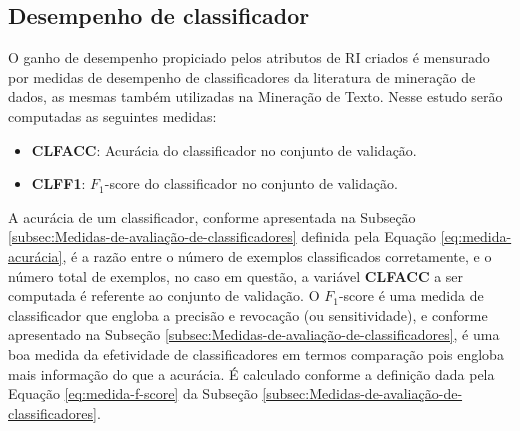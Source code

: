     \subsection{Desempenho de classificador}  \label{subsec:Desempenho-de-classificador}
        O ganho de desempenho propiciado pelos atributos de RI criados é mensurado por medidas de desempenho de classificadores da literatura de mineração de dados, as mesmas também utilizadas na Mineração de Texto.
        Nesse estudo serão computadas as seguintes medidas:
        \begin{itemize}
            \item \textbf{CLF\underscore{}ACC}: Acurácia do classificador no conjunto de validação.
            \item \textbf{CLF\underscore{}F1}: $F_1$-score do classificador no conjunto de validação.
            
    
        \end{itemize}
        A acurácia de um classificador, conforme apresentada na Subseção \ref{subsec:Medidas-de-avaliação-de-classificadores} definida pela Equação \ref{eq:medida-acurácia}, é a razão entre o número de exemplos classificados corretamente, e o número total de exemplos, no caso em questão, a variável \textbf{CLF\underscore{}ACC} a ser computada é referente ao conjunto de validação.
        O $F_1$-score é uma medida de classificador que engloba a precisão e revocação (ou sensitividade), e conforme apresentado na Subseção \ref{subsec:Medidas-de-avaliação-de-classificadores}, é uma boa medida da efetividade de classificadores em termos comparação pois engloba mais informação do que a acurácia. 
        É calculado conforme a definição dada pela Equação \ref{eq:medida-f-score} da Subseção \ref{subsec:Medidas-de-avaliação-de-classificadores}.
        
